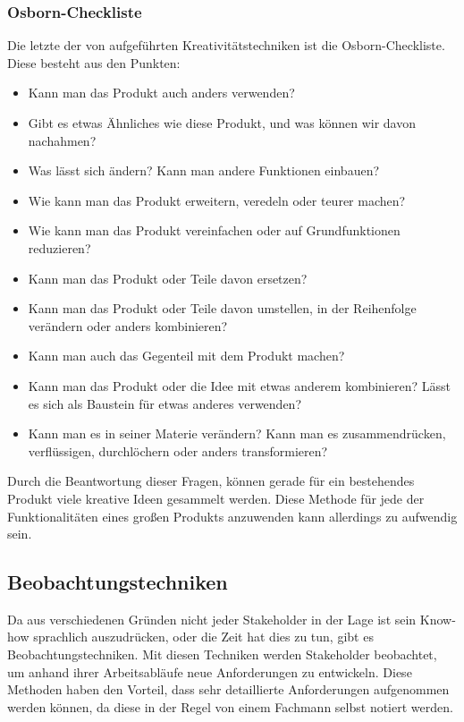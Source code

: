 \subsubsection{Osborn-Checkliste}
Die letzte der von \cite{Rupp2} aufgeführten Kreativitätstechniken ist die Osborn-Checkliste. Diese besteht aus den Punkten:
\begin{itemize}
\item Kann man das Produkt auch anders verwenden?
\item Gibt es etwas Ähnliches wie diese Produkt, und was können wir davon nachahmen?
\item Was lässt sich ändern? Kann man andere Funktionen einbauen?
\item Wie kann man das Produkt erweitern, veredeln oder teurer machen?
\item Wie kann man das Produkt vereinfachen oder auf Grundfunktionen reduzieren?
\item Kann man das Produkt oder Teile davon ersetzen?
\item Kann man das Produkt oder Teile davon umstellen, in der Reihenfolge verändern oder anders kombinieren?
\item Kann man auch das Gegenteil mit dem Produkt machen?
\item Kann man das Produkt oder die Idee mit etwas anderem kombinieren? Lässt es sich als Baustein für etwas anderes verwenden?
\item Kann man es in seiner Materie verändern? Kann man es zusammendrücken, verflüssigen, durchlöchern oder anders transformieren?
\end{itemize}

Durch die Beantwortung dieser Fragen, können gerade für ein bestehendes Produkt viele kreative Ideen gesammelt werden. Diese Methode für jede der Funktionalitäten eines großen Produkts anzuwenden kann allerdings zu aufwendig sein.

\subsection{Beobachtungstechniken}
Da aus verschiedenen Gründen nicht jeder Stakeholder in der Lage ist sein Know-how sprachlich auszudrücken, oder die Zeit hat dies zu tun, gibt es Beobachtungstechniken. Mit diesen Techniken werden Stakeholder beobachtet, um anhand ihrer Arbeitsabläufe neue Anforderungen zu entwickeln. Diese Methoden haben den Vorteil, dass sehr detaillierte Anforderungen aufgenommen werden können, da diese in der Regel von einem Fachmann selbst notiert werden.

